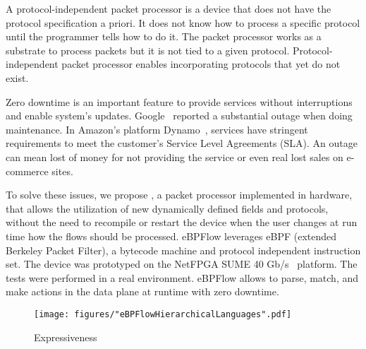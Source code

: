 A protocol-independent packet processor is a device that does not have the protocol specification a priori. It does not know how to process a specific protocol until the programmer tells how to do it. The packet processor works as a substrate to process packets but it is not tied to a given protocol. Protocol-independent packet processor enables incorporating protocols that yet do not exist.


Zero downtime is an important feature to provide services without interruptions and enable system's updates.
Google~\cite{Jain:2013:BEG:2486001.2486019} reported a substantial outage when doing maintenance. In  Amazon's platform Dynamo~\cite{DeCandia:2007:DAH:1294261.1294281},  services have stringent requirements to meet the customer's Service Level Agreements (SLA).
An outage can mean lost of money for not providing the service or even real lost sales on e-commerce sites.


To solve these issues, we propose \system, a packet processor implemented in hardware, that allows the utilization of new dynamically defined fields and protocols, without the need to recompile or restart the device when the user changes at run time how the flows should be processed. 
eBPFlow leverages eBPF (extended Berkeley Packet Filter), a bytecode machine and protocol independent instruction set. %
The device was prototyped on the NetFPGA SUME 40 Gb/s~\cite{SUME2014} platform. The tests were performed in a real environment. eBPFlow allows to parse, match, and make actions in the data plane at runtime with zero downtime.



\begin{figure}[!htp]
\centering
\texttt{[image: figures/"eBPFlowHierarchicalLanguages".pdf]}
\caption{Expressiveness}
\label{fig:Language}
\end{figure}

